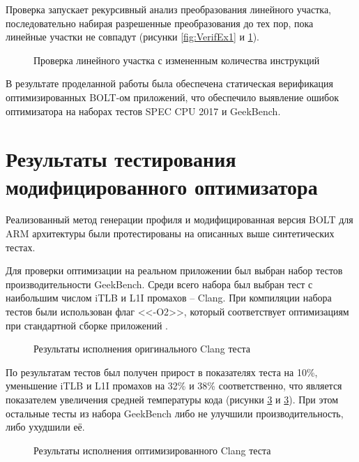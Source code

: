 Проверка запускает рекурсивный анализ преобразования линейного участка, последовательно набирая разрешенные преобразования до тех пор, пока линейные участки не совпадут (рисунки \cref{fig:VerifEx1} и  \cref{fig:VerifEx2}).

\begin{figure}[!h]
    \centerfloat{
        \texttt{[image: v5]}
    }
    \caption{Проверка линейного участка с измененным количества инструкций}\label{fig:VerifEx2}
\end{figure}

В результате проделанной работы была обеспечена статическая верификация оптимизированных BOLT-ом приложений, что обеспечило выявление ошибок оптимизатора на наборах тестов SPEC CPU 2017 и GeekBench.

\section{Результаты тестирования модифицированного оптимизатора}\label{sec:ch3/sect4}
Реализованный метод генерации профиля и модифицированная версия BOLT для ARM архитектуры были протестированы на описанных выше синтетических тестах.

Для проверки оптимизации на реальном приложении был выбран набор тестов производительности GeekBench. Среди всего набора был выбран тест с наибольшим числом iTLB и L1I промахов – Clang. При компиляции набора тестов были использован флаг <<-O2>>, который соответствует оптимизациям при стандартной сборке приложений \cite{vakbib1}.

\begin{figure}[!h]
    \centerfloat{
        \texttt{[image: 14]}
    }
    \caption{Результаты исполнения оригинального Clang теста}\label{fig:ClangRes1}
\end{figure}

По результатам тестов был получен прирост в показателях теста на 10\%, уменьшение iTLB и L1I промахов на 32\% и 38\% соответственно, что является показателем увеличения средней температуры кода (рисунки \cref{fig:ClangRes2} и \cref{fig:ClangRes2}). При этом остальные тесты из набора GeekBench либо не улучшили производительность, либо ухудшили её.

\begin{figure}[!h]
    \centerfloat{
        \texttt{[image: 15]}
    }
    \caption{Результаты исполнения оптимизированного Clang теста}\label{fig:ClangRes2}
\end{figure}


